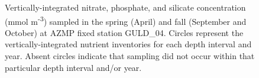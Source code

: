 \documentclass[12pt]{article}\usepackage[]{graphicx}\usepackage[]{color}
\begin{document}
\begin{figure}[htb]

{\centering {} 

}

\caption{Vertically-integrated nitrate, phosphate, and silicate concentration (mmol m\textsuperscript{-3}) sampled in the spring (April) and fall (September and October) at AZMP fixed station GULD\_04. Circles represent the vertically-integrated nutrient inventories for each depth interval and year. Absent circles indicate that sampling did not occur within that particular depth interval and/or year.}\label{fig:figure20}
\end{figure}
\clearpage
\end{document}
